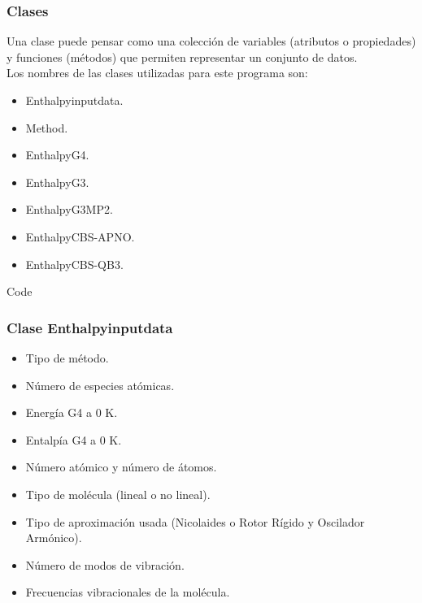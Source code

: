 \documentclass{beamer}
\begin{document}

\begin{frame}
\frametitle{Clases}
Una clase puede pensar como una colección de variables (atributos o propiedades) y funciones (métodos) que permiten representar un conjunto de datos.\\
Los nombres de las clases utilizadas para este programa son:
\begin{itemize}
	\item Enthalpyinputdata.
	\item Method.
	\item EnthalpyG4.
	\item EnthalpyG3.
	\item EnthalpyG3MP2.
	\item EnthalpyCBS-APNO.
	\item EnthalpyCBS-QB3.
\end{itemize}
\end{frame}

\begin{frame}[fragile]{Code}
\frametitle{Clase Enthalpyinputdata}

\begin{itemize}
	\item Tipo de método.
	\item Número de especies atómicas.
	\item Energía G4 a 0 K.
	\item Entalpía G4 a 0 K.
	\item Número atómico y número de átomos.
	\item Tipo de molécula (lineal o no lineal).
	\item Tipo de aproximación usada (Nicolaides o Rotor Rígido y Oscilador Armónico).
	\item Número de modos de vibración.
	\item Frecuencias vibracionales de la molécula.
\end{itemize}
\end{frame}
\end{document}
